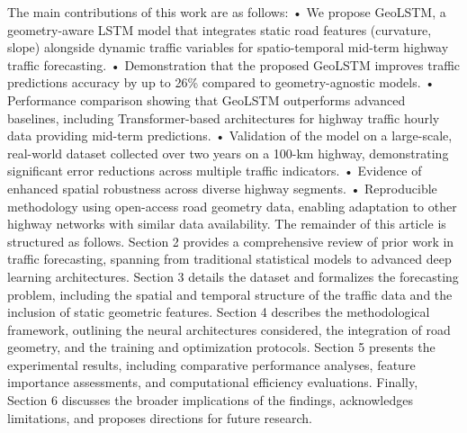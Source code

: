 \documentclass[
  letterpaper,
  DIV=11,
  numbers=noendperiod]{scrartcl}
\begin{document}
The main contributions of this work are as follows: • We propose
GeoLSTM, a geometry-aware LSTM model that integrates static road
features (curvature, slope) alongside dynamic traffic variables for
spatio-temporal mid-term highway traffic forecasting. • Demonstration
that the proposed GeoLSTM improves traffic predictions accuracy by up to
26\% compared to geometry-agnostic models. • Performance comparison
showing that GeoLSTM outperforms advanced baselines, including
Transformer-based architectures for highway traffic hourly data
providing mid-term predictions. • Validation of the model on a
large-scale, real-world dataset collected over two years on a 100-km
highway, demonstrating significant error reductions across multiple
traffic indicators. • Evidence of enhanced spatial robustness across
diverse highway segments. • Reproducible methodology using open-access
road geometry data, enabling adaptation to other highway networks with
similar data availability. The remainder of this article is structured
as follows. Section 2 provides a comprehensive review of prior work in
traffic forecasting, spanning from traditional statistical models to
advanced deep learning architectures. Section 3 details the dataset and
formalizes the forecasting problem, including the spatial and temporal
structure of the traffic data and the inclusion of static geometric
features. Section 4 describes the methodological framework, outlining
the neural architectures considered, the integration of road geometry,
and the training and optimization protocols. Section 5 presents the
experimental results, including comparative performance analyses,
feature importance assessments, and computational efficiency
evaluations. Finally, Section 6 discusses the broader implications of
the findings, acknowledges limitations, and proposes directions for
future research.
\end{document}
